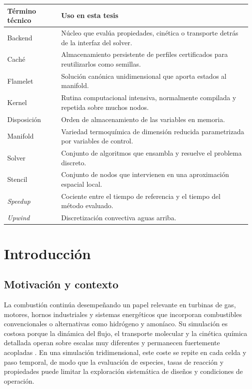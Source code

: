 \documentclass[12pt,a4paper,twoside,openany]{book}
\begin{document}
\begin{longtable}{@{}p{}p{}@{}}
\toprule
\textbf{Término técnico} & \textbf{Uso en esta tesis} \\
\midrule
\endhead
Backend & Núcleo que evalúa propiedades, cinética o transporte detrás de la interfaz del solver. \\
Caché & Almacenamiento persistente de perfiles certificados para reutilizarlos como semillas. \\
Flamelet & Solución canónica unidimensional que aporta estados al manifold. \\
Kernel & Rutina computacional intensiva, normalmente compilada y repetida sobre muchos nodos. \\
Disposición & Orden de almacenamiento de las variables en memoria. \\
Manifold & Variedad termoquímica de dimensión reducida parametrizada por variables de control. \\
Solver & Conjunto de algoritmos que ensambla y resuelve el problema discreto. \\
Stencil & Conjunto de nodos que intervienen en una aproximación espacial local. \\
\emph{Speedup} & Cociente entre el tiempo de referencia y el tiempo del método evaluado. \\
\emph{Upwind} & Discretización convectiva aguas arriba. \\
\bottomrule
\end{longtable}

\cleardoublepage
{}

\chapter{Introducción}
\label{chap:introduccion}

\section{Motivación y contexto}

La combustión continúa desempeñando un papel relevante en turbinas de gas,
motores, hornos industriales y sistemas energéticos que incorporan combustibles
convencionales o alternativas como hidrógeno y amoníaco. Su simulación es
costosa porque la dinámica del flujo, el transporte molecular y la cinética
química detallada operan sobre escalas muy diferentes y permanecen fuertemente
acopladas \cite{Peters1984,Poinsot2005,Kee2017}. En una simulación
tridimensional, este coste se repite en cada celda y paso temporal, de modo que
la evaluación de especies, tasas de reacción y propiedades puede limitar la
exploración sistemática de diseños y condiciones de operación.
\end{document}
